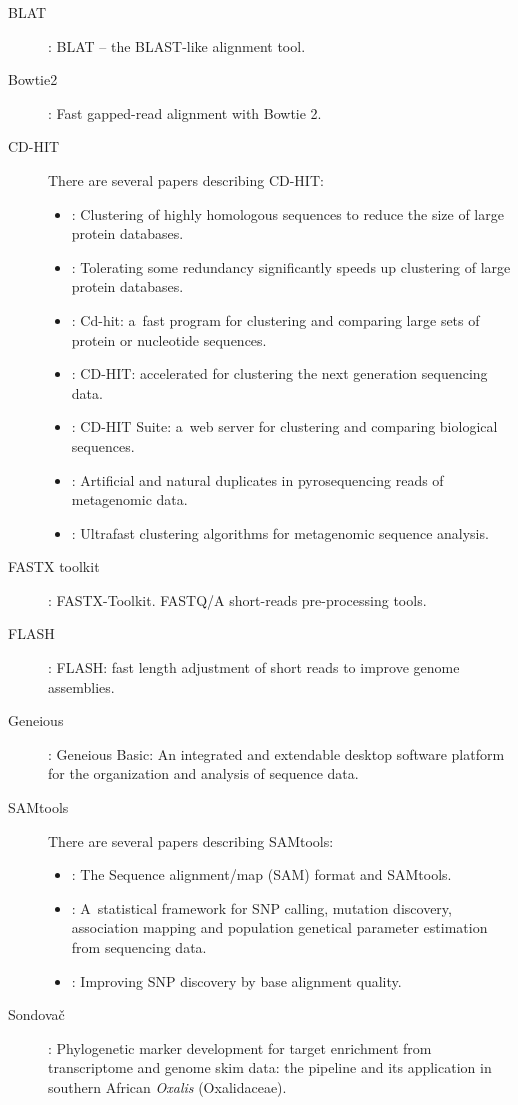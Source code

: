 \documentclass[a4paper, 11pt, twoside]{article}
\begin{document}
\begin{description}
 \item[BLAT] \citet{Kent2002}: BLAT -- the BLAST-like alignment tool.
 \item[Bowtie2] \citet{Langmead2012}: Fast gapped-read alignment with Bowtie 2.
 \item[CD-HIT] There are several papers describing CD-HIT:
  \begin{itemize}
    \item \citet{Li2001}: Clustering of highly homologous sequences to reduce the size of large protein databases.
    \item \citet{Li2002}: Tolerating some redundancy significantly speeds up clustering of large protein databases.
    \item \citet{Li2006}: Cd-hit: a~fast program for clustering and comparing large sets of protein or nucleotide sequences.
    \item \citet{Fu2012}: CD-HIT: accelerated for clustering the next generation sequencing data.
    \item \citet{Huang2010}: CD-HIT Suite: a~web server for clustering and comparing biological sequences.
    \item \citet{Niu2010}: Artificial and natural duplicates in pyrosequencing reads of metagenomic data.
    \item \citet{Li2012b}: Ultrafast clustering algorithms for metagenomic sequence analysis.
   \end{itemize}
 \item[FASTX toolkit] \citet{Gordon2010}: FASTX-Toolkit. FASTQ/A short-reads pre-processing tools.
 \item[FLASH] \citet{Magoc2011}: FLASH: fast length adjustment of short reads to improve genome assemblies.
 \item[Geneious] \citet{Kearse2012}: Geneious Basic: An integrated and extendable desktop software platform for the organization and analysis of sequence data.
 \item[SAMtools] There are several papers describing SAMtools:
  \begin{itemize}
   \item \citet{Li2009}: The Sequence alignment/map (SAM) format and SAMtools.
   \item \citet{Li2011}: A~statistical framework for SNP calling, mutation discovery, association mapping and population genetical parameter estimation from sequencing data.
   \item \citet{Li2011a}: Improving SNP discovery by base alignment quality.
  \end{itemize}
 \item[Sondovač] \citet{Schmickl2016}: Phylogenetic marker development for target enrichment from transcriptome and genome skim data: the pipeline and its application in southern African \textit{Oxalis} (Oxalidaceae).
\end{description}
\end{document}
